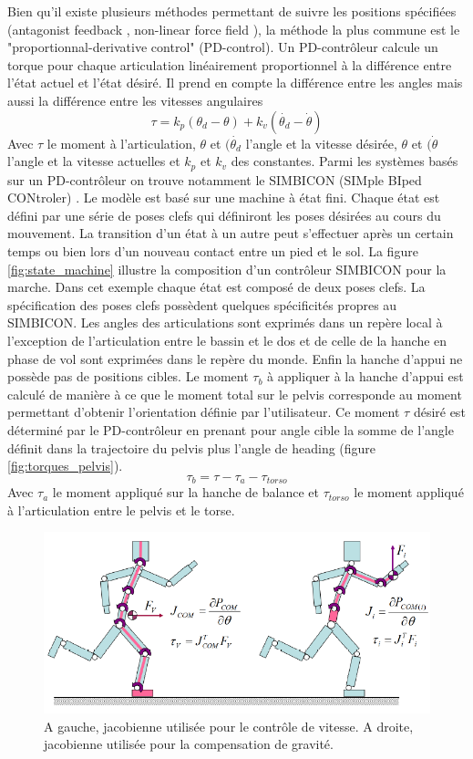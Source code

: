 \documentclass{llncs}
\begin{document}
Bien qu'il existe plusieurs méthodes permettant de suivre les positions spécifiées (antagonist feedback \cite{neff2002modeling}, non-linear force field \cite{mussa1997nonlinear}), la méthode la plus commune est le "proportionnal-derivative control" (PD-control). Un PD-contrôleur calcule un torque pour chaque articulation linéairement proportionnel à la différence entre l'état actuel et l'état désiré. Il prend en compte la différence entre les angles mais aussi la différence entre les vitesses angulaires 
\[
\tau=k_p(\theta_d - \theta) + k_v(\dot{\theta_d} - \dot{\theta})
\]
Avec \(\tau\) le moment à l'articulation, \(\theta\) et \((\dot{\theta_d}\) l'angle et la vitesse désirée, \(\theta\) et \((\dot{\theta}\) l'angle et la vitesse actuelles et \(k_p\) et \(k_v\) des constantes.
Parmi les systèmes basés sur un PD-contrôleur on trouve notamment le SIMBICON (SIMple BIped CONtroler) \cite{yin2007simbicon}. Le modèle est basé sur une machine à état fini. Chaque état est défini par une série de poses clefs qui définiront les poses désirées au cours du mouvement. La transition d'un état à un autre peut s'effectuer après un certain temps ou bien lors d'un nouveau contact entre un pied et le sol. La figure \ref{fig:state_machine} illustre la composition d'un contrôleur SIMBICON pour la marche. Dans cet exemple chaque état est composé de deux poses clefs. La spécification des poses clefs possèdent quelques spécificités propres au SIMBICON. Les angles des articulations sont exprimés dans un repère local à l'exception de l'articulation entre le bassin et le dos et de celle de la hanche en phase de vol sont exprimées dans le repère du monde. Enfin la hanche d'appui ne possède pas de positions cibles. Le moment \(\tau_b \) à appliquer à la hanche d'appui est calculé de manière à ce que le moment total sur le pelvis corresponde au moment permettant d'obtenir l'orientation définie par l'utilisateur. Ce moment \(\tau \) désiré est déterminé par le PD-contrôleur en prenant pour angle cible la somme de l'angle définit dans la trajectoire du pelvis plus l'angle de heading (figure \ref{fig:torques_pelvis}).
\[
\tau_b=\tau - \tau_a - \tau_{torso}
\]
Avec \(\tau_a \) le moment appliqué sur la hanche de balance et \(\tau_{torso} \) le moment appliqué à l'articulation entre le pelvis et le torse.


\label{sec:jacob}
\begin{figure}[h]
\centering
\includegraphics[scale=0.5]{shema_jacobians.png}
\caption{A gauche, jacobienne utilisée pour le contrôle de vitesse. A droite, jacobienne utilisée pour la compensation de gravité. \cite{coros2010generalized} }
\label{fig:jacob}
\end{figure}
\end{document}
